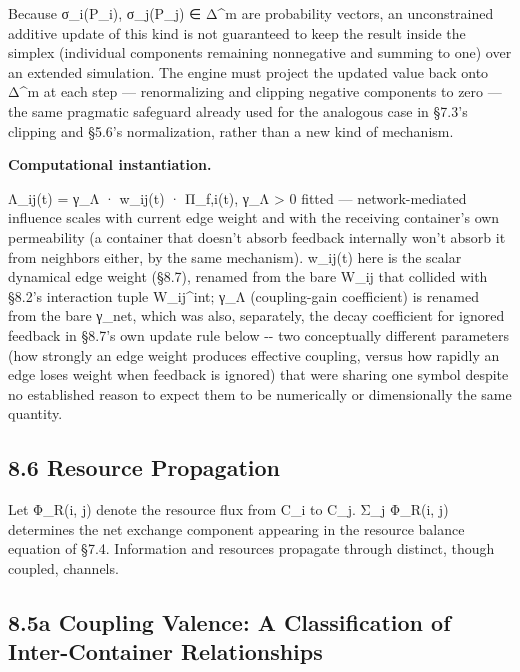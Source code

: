 \documentclass[
]{article}
\begin{document}
Because σ\_i(P\_i), σ\_j(P\_j) ∈ Δ\^{}m are probability vectors, an
unconstrained additive update of this kind is not guaranteed to keep the
result inside the simplex (individual components remaining nonnegative
and summing to one) over an extended simulation. The engine must project
the updated value back onto Δ\^{}m at each step --- renormalizing and
clipping negative components to zero --- the same pragmatic safeguard
already used for the analogous case in §7.3's clipping and §5.6's
normalization, rather than a new kind of mechanism.

\textbf{Computational instantiation.}

Λ\_ij(t) = γ\_Λ · w\_ij(t) · Π\_f,i(t), γ\_Λ \textgreater{} 0 fitted ---
network-mediated influence scales with current edge weight and with the
receiving container's own permeability (a container that doesn't absorb
feedback internally won't absorb it from neighbors either, by the same
mechanism). w\_ij(t) here is the scalar dynamical edge weight (§8.7),
renamed from the bare W\_ij that collided with §8.2's interaction tuple
W\_ij\^{}int; γ\_Λ (coupling-gain coefficient) is renamed from the bare
γ\_net, which was also, separately, the decay coefficient for ignored
feedback in §8.7's own update rule below -\/- two conceptually different
parameters (how strongly an edge weight produces effective coupling,
versus how rapidly an edge loses weight when feedback is ignored) that
were sharing one symbol despite no established reason to expect them to
be numerically or dimensionally the same quantity.

\hypertarget{resource-propagation}{%
\subsection{8.6 Resource Propagation}\label{resource-propagation}}

Let Φ\_R(i, j) denote the resource flux from C\_i to C\_j. Σ\_j Φ\_R(i,
j) determines the net exchange component appearing in the resource
balance equation of §7.4. Information and resources propagate through
distinct, though coupled, channels.

\hypertarget{a-coupling-valence-a-classification-of-inter-container-relationships}{%
\subsection{8.5a Coupling Valence: A Classification of Inter-Container
Relationships}\label{a-coupling-valence-a-classification-of-inter-container-relationships}}
\end{document}
